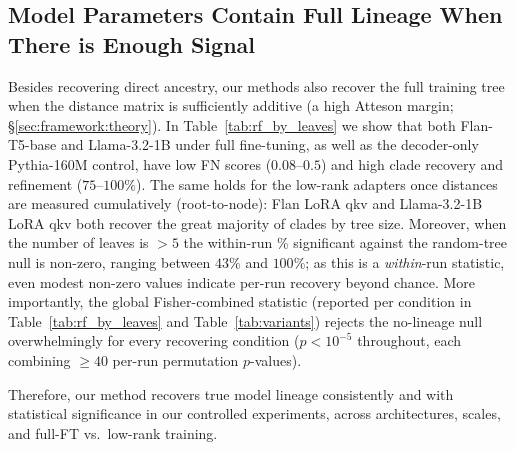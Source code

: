 \documentclass{article}
\theoremstyle{definition}
\theoremstyle{plain}
\begin{document}
\subsection{Model Parameters Contain Full Lineage When There is Enough Signal}
\label{sec:results:weighttree}
Besides recovering direct ancestry, our methods also recover the full training tree when the
distance matrix is sufficiently additive (a high Atteson margin; \S\ref{sec:framework:theory}).  In
Table~\ref{tab:rf_by_leaves} we show that both Flan-T5-base and Llama-3.2-1B under full fine-tuning,
as well as the decoder-only Pythia-160M control, have low FN scores ($0.08$--$0.5$) and high clade
recovery and refinement ($75$--$100\%$).  The same holds for the low-rank adapters once distances are
measured cumulatively (root-to-node): Flan LoRA qkv and Llama-3.2-1B LoRA qkv both recover the great
majority of clades by tree size.  Moreover, when the number of leaves is $>5$ the within-run \%
significant against the random-tree null is non-zero, ranging between $43\%$ and $100\%$; as this is a
\textit{within}-run statistic, even modest non-zero values indicate per-run recovery beyond chance.
More importantly, the global Fisher-combined statistic (reported per condition in
Table~\ref{tab:rf_by_leaves} and Table~\ref{tab:variants}) rejects the no-lineage null overwhelmingly
for every recovering condition ($p<10^{-5}$ throughout, each combining $\geq 40$ per-run permutation
$p$-values).

Therefore, our method recovers true model lineage consistently and with statistical significance in
our controlled experiments, across architectures, scales, and full-FT vs.\ low-rank training.
\end{document}
